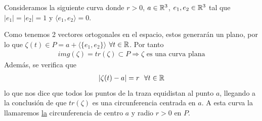 \begin{ejemplo} Consideramos la siguiente curva
    donde $r>0$, $a\in \mathbb{R}^3$, $e_1,e_2\in \mathbb{R}^3$ tal que $|e_1|=|e_2|=1$ y $\langle e_1,e_2 \rangle = 0$.

    Como tenemos 2 vectores ortogonales en el espacio, estos generarán un plano, por lo que $\zeta(t)\in P = a + \langle \{e_1,e_2\}\rangle$ $\forall t \in \mathbb{R}$. Por tanto
    \begin{gather*}
        img(\zeta) = tr(\zeta) \subset P \Rightarrow \zeta \text{ es una curva plana}
    \end{gather*}
    Además, se verifica que 
    \begin{gather*}
        |\zeta(t) - a | = r \ \ \forall t\in \mathbb{R}
    \end{gather*}
    lo que nos dice que todos los puntos de la traza equidistan al punto $a$, llegando a la conclusión de que $tr(\zeta)$ es una circunferencia centrada en $a$. A esta curva la llamaremos \underline{la} circunferencia de centro $a$ y radio $r>0$ en $P$.

    \begin{center}
    \end{center}


\end{ejemplo}

